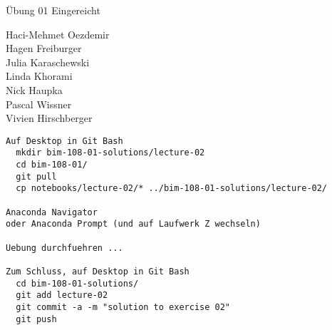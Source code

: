 \documentclass{beamer}
\begin{document}
\begin{frame}{Übung 01 Eingereicht}
	
	\fboxsep=0pt
	\noindent%
	\begin{minipage}[t]{0.48\linewidth}
		Haci-Mehmet Oezdemir \\
		Hagen Freiburger \\
		Julia Karaschewski \\
		Linda Khorami \\
		Nick Haupka \\
		Pascal Wissner \\
		Vivien Hirschberger
	\end{minipage}%
	
\end{frame}

\begin{frame}[fragile]
  
  \small
  \begin{lstlisting}
Auf Desktop in Git Bash
  mkdir bim-108-01-solutions/lecture-02
  cd bim-108-01/
  git pull
  cp notebooks/lecture-02/* ../bim-108-01-solutions/lecture-02/

Anaconda Navigator 
oder Anaconda Prompt (und auf Laufwerk Z wechseln)

Uebung durchfuehren ...

Zum Schluss, auf Desktop in Git Bash
  cd bim-108-01-solutions/
  git add lecture-02
  git commit -a -m "solution to exercise 02"
  git push
  \end{lstlisting}
  
\end{frame}
\end{document}
